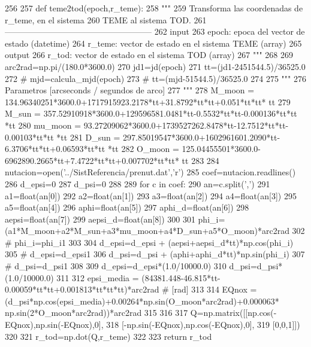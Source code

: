 \begin{DoxyCode}
256 
257 def teme2tod(epoch,r_teme):
258     """
259     Transforma las coordenadas de r_teme, en el sistema
260     TEME al sistema TOD.
261     -----------------------------------------------------
262     input
263         epoch: epoca del vector de estado (datetime)
264         r_teme: vector de estado en el sistema TEME (array)
265     output
266         r_tod: vector de estado en el sistema TOD (array)
267     """
268     
269     arc2rad=np.pi/(180.0*3600.0)   
270     jd1=jd(epoch)
271     tt=(jd1-2451544.5)/36525.0 
272 #     mjd=calcula_mjd(epoch)
273 #     tt=(mjd-51544.5)/36525.0
274 
275     """
276     Parametros [arcseconds / segundos de arco]
277     """
278     M_moon  = 134.96340251*3600.0+1717915923.2178*tt+31.8792*tt*tt+0.051*tt*tt*
      tt
279     M_sun   = 357.52910918*3600.0+129596581.0481*tt-0.5532*tt*tt-0.000136*tt*tt
      *tt
280     mu_moon = 93.27209062*3600.0+1739527262.8478*tt-12.7512*tt*tt-0.00103*tt*tt
      *tt
281     D_sun   = 297.85019547*3600.0+1602961601.2090*tt-6.3706*tt*tt+0.06593*tt*tt
      *tt
282     O_moon  = 125.04455501*3600.0-6962890.2665*tt+7.4722*tt*tt+0.007702*tt*tt*
      tt
283     
284     nutacion=open('../SistReferencia/prenut.dat','r')
285     coef=nutacion.readlines()
286     d_epsi=0
287     d_psi=0
288     
289     for c in coef:
290         an=c.split(',')
291         a1=float(an[0])
292         a2=float(an[1])
293         a3=float(an[2])
294         a4=float(an[3])
295         a5=float(an[4])
296         aphi=float(an[5])
297         aphi_d=float(an[6])
298         aepsi=float(an[7])
299         aepsi_d=float(an[8])
300         
301         phi_i=(a1*M_moon+a2*M_sun+a3*mu_moon+a4*D_sun+a5*O_moon)*arc2rad
302 #        phi_i=phi_i1%
303         
304         d_epsi=d_epsi + (aepsi+aepsi_d*tt)*np.cos(phi_i)
305 #        d_epsi=d_epsi1%
306         d_psi=d_psi + (aphi+aphi_d*tt)*np.sin(phi_i)
307 #        d_psi=d_psi1%
308 
309     d_epsi=d_epsi*(1.0/10000.0)
310     d_psi=d_psi*(1.0/10000.0)
311 
312     epsi_media = (84381.448-46.815*tt-0.00059*tt*tt+0.001813*tt*tt*tt)*arc2rad 
      # [rad]
313     
314     EQnox = (d_psi*np.cos(epsi_media)+0.00264*np.sin(O_moon*arc2rad)+0.000063*
      np.sin(2*O_moon*arc2rad))*arc2rad
315 
316     
317     Q=np.matrix([[np.cos(-EQnox),np.sin(-EQnox),0],
318                  [-np.sin(-EQnox),np.cos(-EQnox),0],
319                  [0,0,1]])
320     
321     r_tod=np.dot(Q,r_teme)
322     
323     return r_tod    
    
\end{DoxyCode}


